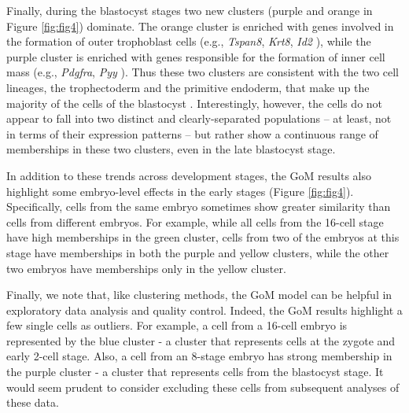 Finally, during the blastocyst stages two new clusters (purple and orange in Figure \ref{fig:fig4}) dominate.
The orange cluster is enriched with genes involved in the formation of outer trophoblast cells (e.g., \textit{Tspan8}, \textit{Krt8}, \textit{Id2} \cite{Guo2010}), while the purple cluster is enriched with genes responsible for the formation of inner cell mass (e.g., \textit{Pdgfra}, \textit{Pyy} \cite{Hou2007}). 
Thus these two clusters are consistent with the two cell lineages, the trophectoderm
and the primitive endoderm, that make up the majority of
the cells of the blastocyst \cite{Rossant1995}. Interestingly, however, the cells do not appear to fall into two distinct and clearly-separated populations
-- at least, not in terms of their expression patterns -- but rather show a continuous
range of memberships in these two clusters, even in the late blastocyst stage.

In addition to these trends across development stages, the GoM results also highlight some embryo-level effects in the early stages (Figure \ref{fig:fig4}). 
Specifically, cells from the same embryo sometimes show greater similarity than cells from different embryos.
For example, while all cells from the 16-cell stage have high memberships in the green cluster, cells from two of the embryos at this stage have memberships in both the purple and yellow clusters, while the other two embryos have memberships only in the yellow cluster. 

Finally, we note that, like clustering methods, the GoM model can be helpful in exploratory data analysis and quality control. Indeed, 
the GoM results highlight a few single cells as outliers. For example, a cell from a 16-cell embryo is represented by the blue cluster - a cluster that represents cells at the zygote and early 2-cell stage. Also, a cell from an 8-stage embryo has strong membership in the purple cluster - a cluster that represents cells from the blastocyst stage. 
It would seem prudent to consider excluding these cells from subsequent analyses of these data.


